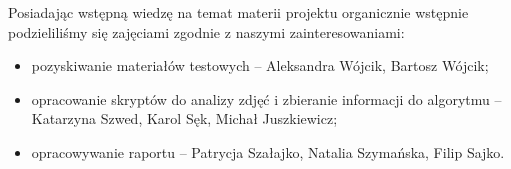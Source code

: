 \documentclass[]{mwart}
\begin{document}
Posiadając wstępną wiedzę na temat materii projektu organicznie wstępnie
podzieliliśmy się zajęciami zgodnie z naszymi zainteresowaniami: \newline
\begin{itemize}
    \item pozyskiwanie materiałów testowych -- Aleksandra Wójcik, Bartosz Wójcik;
    \item opracowanie skryptów do analizy zdjęć i zbieranie informacji do algorytmu -- Katarzyna Szwed, Karol Sęk, Michał Juszkiewicz;
    \item opracowywanie raportu -- Patrycja Szałajko, Natalia Szymańska, Filip Sajko.
\end{itemize}
\end{document}
